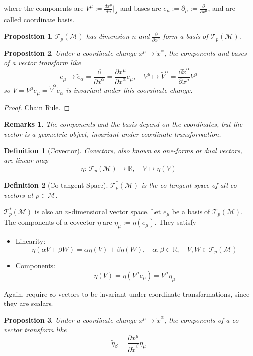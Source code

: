 \documentclass[a4paper]{article}
\newtheorem{remarks}{Remarks}[section]
\theoremstyle{new}
\newtheorem{defi}{Definition}[section]
\newtheorem{prop}{Proposition}[section]
\begin{document}
where the components are $V^\mu:=\frac{dx^\mu}{du}|_\lambda$ and bases are $e_\mu:=\partial_\mu:=\frac{\partial }{\partial x^\mu}$, and are called coordinate basis.
\begin{prop}
$\mathcal{T}_p(\mathcal{M})$ has dimension $n$ and $\frac{\partial}{\partial x^\mu}$ form a basis of $\mathcal{T}_p(\mathcal{M})$.
\end{prop}
\begin{prop}
Under a coordinate change $x^\mu\rightarrow\tilde{x}^\alpha$, the components and bases of a vector transform like
$$e_\mu\mapsto\tilde{e}_\alpha=\frac{\partial}{\partial\tilde{x}^\alpha}=\frac{\partial x^\mu}{\partial\tilde{x}^\alpha}e_\mu,\quad V^\mu\mapsto\tilde{V}^\alpha=\frac{\partial\tilde{x}^\alpha}{\partial x^\mu}V^\mu$$
so $V=V^\mu e_\mu=\tilde{V}^\alpha\tilde{e}_\alpha$ is invariant under this coordinate change.
\end{prop}
\begin{proof}
Chain Rule.
\end{proof}
\begin{remarks}
The components and the basis depend on the coordinates, but the vector is a geometric object, invariant under coordinate transformation. 
\end{remarks}
\begin{defi}[Covector]
Covectors, also known as one-forms or dual vectors, are linear map 
$$\eta:~\mathcal{T}_p(\mathcal{M})\rightarrow\mathbb{R},\quad V\mapsto\eta(V)$$
\end{defi}
\begin{defi}[Co-tangent Space]
$\mathcal{T}_p^*(\mathcal{M})$ is the co-tangent space of all co-vectors at $p\in\mathcal{M}$.
\end{defi}
$\mathcal{T}_p^*(\mathcal{M})$ is also an $n$-dimensional vector space. Let $e_\mu$ be a basis of $\mathcal{T}_p(\mathcal{M})$. The components of a covector $\eta$ are $\eta_\mu:=\eta(e_\mu)$. They satisfy
\begin{itemize}
    \item Linearity: 
    $$\eta(\alpha V+\beta W)=\alpha\eta(V)+\beta\eta(W),\quad\alpha,\beta\in\mathbb{R},\quad V,W\in\mathcal{T}_p(\mathcal{M})$$
    \item Components:
    $$\eta(V)=\eta(V^\mu e_\mu)=V^\mu\eta_\mu$$
\end{itemize}
Again, require co-vectors to be invariant under coordinate transformations, since they are scalars.
\begin{prop}
Under a coordinate change $x^\mu\rightarrow\tilde{x}^\alpha$, the components of a co-vector transform like
$$\tilde{\eta}_\beta=\frac{\partial x^\mu}{\partial\tilde{x}^\beta}\eta_\mu$$
\end{prop}
\end{document}
